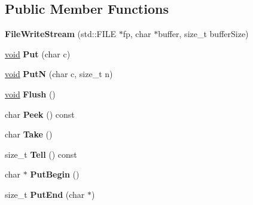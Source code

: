 \subsection*{Public Member Functions}
\begin{DoxyCompactItemize}
\item 
\hypertarget{class_file_write_stream_a553ea3e7377a7f7cace2daa3cc90e1a1}{}{\bfseries File\+Write\+Stream} (std\+::\+F\+I\+L\+E $\ast$fp, char $\ast$buffer, size\+\_\+t buffer\+Size)\label{class_file_write_stream_a553ea3e7377a7f7cace2daa3cc90e1a1}

\item 
\hypertarget{class_file_write_stream_af6a6061d0accd939fa475b9b34427d85}{}\hyperlink{_s_d_l__audio_8h_a52835ae37c4bb905b903cbaf5d04b05f}{void} {\bfseries Put} (char c)\label{class_file_write_stream_af6a6061d0accd939fa475b9b34427d85}

\item 
\hypertarget{class_file_write_stream_ad9ec108b24316a2c1c83c6ddc75d308a}{}\hyperlink{_s_d_l__audio_8h_a52835ae37c4bb905b903cbaf5d04b05f}{void} {\bfseries Put\+N} (char c, size\+\_\+t n)\label{class_file_write_stream_ad9ec108b24316a2c1c83c6ddc75d308a}

\item 
\hypertarget{class_file_write_stream_a939fbf183ba36464c5e0837df4329d37}{}\hyperlink{_s_d_l__audio_8h_a52835ae37c4bb905b903cbaf5d04b05f}{void} {\bfseries Flush} ()\label{class_file_write_stream_a939fbf183ba36464c5e0837df4329d37}

\item 
\hypertarget{class_file_write_stream_a83a8321c33738544f05330f3638e51c0}{}char {\bfseries Peek} () const \label{class_file_write_stream_a83a8321c33738544f05330f3638e51c0}

\item 
\hypertarget{class_file_write_stream_ac927a0ae09a85eaba58a74ceb04b40ed}{}char {\bfseries Take} ()\label{class_file_write_stream_ac927a0ae09a85eaba58a74ceb04b40ed}

\item 
\hypertarget{class_file_write_stream_a72889b68dbd766cea0e003389b990722}{}size\+\_\+t {\bfseries Tell} () const \label{class_file_write_stream_a72889b68dbd766cea0e003389b990722}

\item 
\hypertarget{class_file_write_stream_a4d1340a64fde3f16ac2afce19537c75e}{}char $\ast$ {\bfseries Put\+Begin} ()\label{class_file_write_stream_a4d1340a64fde3f16ac2afce19537c75e}

\item 
\hypertarget{class_file_write_stream_a54b14047e4c998db0594290605f8f0dc}{}size\+\_\+t {\bfseries Put\+End} (char $\ast$)\label{class_file_write_stream_a54b14047e4c998db0594290605f8f0dc}

\end{DoxyCompactItemize}


